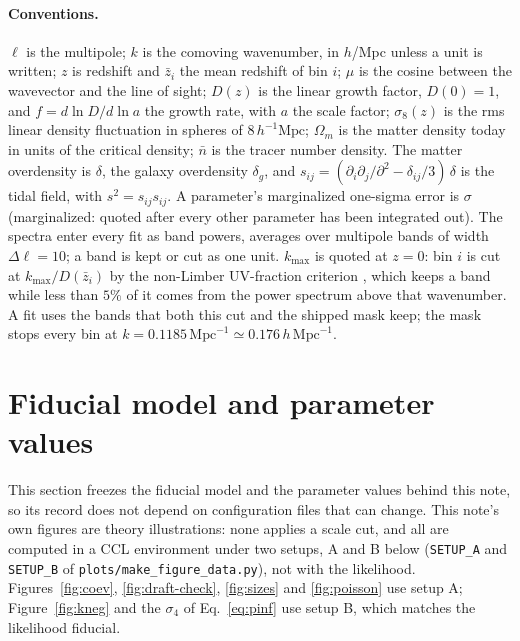 \documentclass[11pt]{article}
\newcommand{\kmax}{k_{\mathrm{max}}}
\newcommand{\hMpc}{\,h\,\mathrm{Mpc}^{-1}}
\newcommand{\Mpch}{\,h^{-1}\mathrm{Mpc}}
\begin{document}
\paragraph{Conventions.}
$\ell$ is the multipole; $k$ is the comoving wavenumber, in $h$/Mpc
unless a unit is written; $z$ is redshift and $\bar{z}_i$ the mean redshift of bin $i$; $\mu$ is
the cosine between the wavevector and the line of sight; $D(z)$ is the
linear growth factor, $D(0) = 1$, and $f = d\ln D/d\ln a$ the growth
rate, with $a$ the scale factor; $\sigma_8(z)$ is the rms linear
density fluctuation in spheres of $8\Mpch$; $\Omega_m$ is the matter
density today in units of the critical density; $\bar{n}$ is the
tracer number density.  The matter overdensity is $\delta$, the galaxy
overdensity $\delta_g$, and
$s_{ij} = (\partial_i\partial_j/\partial^2 - \delta_{ij}/3)\,\delta$ is
the tidal field, with $s^2 = s_{ij}s_{ij}$.  A parameter's
marginalized one-sigma error is $\sigma$ (marginalized: quoted after
every other parameter has been integrated out).  The spectra enter
every fit as band powers, averages over multipole bands of width
$\Delta\ell = 10$; a band is kept or cut as one unit.  $\kmax$ is
quoted at
$z = 0$: bin $i$ is cut at $\kmax/D(\bar{z}_i)$ by the non-Limber
UV-fraction criterion \cite{Saraivanov2026}, which keeps a band while
less than $5\%$ of it comes from the power spectrum above that
wavenumber.  A fit uses the bands that both this cut and the shipped
mask keep; the mask stops every bin at
$k = 0.1185\,\mathrm{Mpc}^{-1} \simeq 0.176\hMpc$.

\section{Fiducial model and parameter values}
\label{sec:fiducial}

This section freezes the fiducial model and the parameter values
behind this note, so its record does not depend on configuration files
that can change.  This note's own figures are theory illustrations:
none applies a scale cut, and all are computed in a CCL environment
under two setups, A and B below (\texttt{SETUP\_A} and \texttt{SETUP\_B}
of \texttt{plots/make\_figure\_data.py}), not with the likelihood.
Figures~\ref{fig:coev}, \ref{fig:draft-check}, \ref{fig:sizes} and
\ref{fig:poisson} use setup A; Figure~\ref{fig:kneg} and the $\sigma_4$
of Eq.~\eqref{eq:pinf} use setup B, which matches the likelihood
fiducial.
\end{document}
